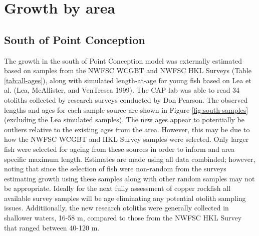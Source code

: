 \documentclass[11pt,
  english,
  a4paper,
]{article}
\begin{document}
\clearpage


\hypertarget{growth-by-area}{%
\section{Growth by area}\label{growth-by-area}}

\leavevmode\tagmcend\tagstructend


\hypertarget{south-of-point-conception}{%
\subsection{South of Point Conception}\label{south-of-point-conception}}

\leavevmode\tagmcend\tagstructend


The growth in the south of Point Conception model was externally estimated based on samples from the NWFSC WCGBT and NWFSC HKL Surveys (Table \ref{tab:all-ages}), along with simulated length-at-age for young fish based on Lea et al. {(Lea, McAllister, and VenTresca 1999)\leavevmode\tagmcend\tagstructend}. The CAP lab was able to read 34 otoliths collected by research surveys conducted by Don Pearson. The observed lengths and ages for each sample source are shown in Figure \ref{fig:south-samples} (excluding the Lea simulated samples). The new ages appear to potentially be outliers relative to the existing ages from the area. However, this may be due to how the NWFSC WCGBT and HKL Survey samples were selected. Only larger fish were selected for ageing from these sources in order to inform and area specific maximum length. Estimates are made using all data combinded; however, noting that since the selection of fish were non-random from the surveys estimating growth using these samples along with other random samples may not be appropriate. Ideally for the next fully assessment of copper rockfish all available survey samples will be age eliminating any potential otolith sampling issues. Additiionally, the new research otoliths were generally collected in shallower waters, 16-58 m, compared to those from the NWFSC HKL Survey that ranged between 40-120 m.

\leavevmode\tagmcend\tagstructend\par
\end{document}
